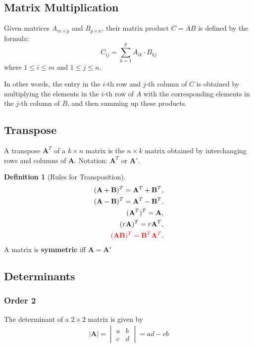 \documentclass[11pt,a4paper]{book}
\newcommand{\red}[1]{\textcolor{red}{#1}}
\theoremstyle{definition}\newtheorem{definition}{Definition}
\theoremstyle{definition}\newtheorem{fact}{Fact}
\theoremstyle{definition}\newtheorem{remark}{Remark}
\theoremstyle{definition}\newtheorem{ex}{Ex.}
\theoremstyle{definition}\newtheorem{project}{Project}
\theoremstyle{definition}\newtheorem{problem}{Problem}
\theoremstyle{definition}\newtheorem{example}{Example}
\newenvironment{fdefinition}
{\begin{mdframed}\begin{definition}}
		{\end{definition}\end{mdframed}}
\numberwithin{theorem}{section}
\numberwithin{corollary}{chapter}
\numberwithin{assumption}{chapter}
\numberwithin{definition}{chapter}
\numberwithin{prop}{chapter}
\numberwithin{notation}{chapter}
\numberwithin{problem}{chapter}
\numberwithin{example}{chapter}
\numberwithin{fact}{chapter}
\numberwithin{ex}{chapter}
\def\A{\mathbf A}
\def\B{\mathbf B}
\begin{document}
\begin{appendices}
	\subsection{Matrix Multiplication}
	
	Given matrices \( A_{m \times p} \) and \( B_{p \times n} \), their matrix product \( C = AB \) is defined by the formula:
	\[
	C_{ij} = \sum_{k=1}^{p} A_{ik} \cdot B_{kj}
	\]
	where \( 1 \leq i \leq m \) and \( 1 \leq j \leq n \).
	
	In other words, the entry in the \( i \)-th row and \( j \)-th column of \( C \) is obtained by multiplying the elements in the \( i \)-th row of \( A \) with the corresponding elements in the \( j \)-th column of \( B \), and then summing up these products.
	
	\subsection{Transpose}
	A transpose $\A^T$ of a $k \times n$ matrix is the $n\times k$ matrix obtained by interchanging rows and columns of $\A$. Notation: $\A^T$ or $\A'$.
	
	\begin{fdefinition}[Rules for Transposition]
		\begin{align*}
			(\A+\B)^T = \A^T + \B^T,    \\
			(\A-\B)^T = \A^T - \B^T,    \\
			(\A^T)^T = \A,              \\
			(r\A)^T = r\A^T,            \\
			\red{(\A\B)^T = \B^T \A^T}. 
		\end{align*}
		A matrix is \textbf{symmetric} iff $\A = \A'$
	\end{fdefinition}
	
	\subsection{Determinants}
	\subsubsection*{Order 2}
	The determinant of a $2\times 2$ matrix is given by
	\begin{align*}
		|\A| = \begin{vmatrix}
			a & b \\ c & d
		\end{vmatrix} = ad - cb
	\end{align*}
	

\end{appendices}
\end{document}
